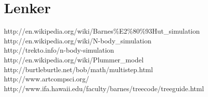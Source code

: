 \documentclass[11pt, oneside]{article}   	%
\begin{document}
\newpage
\section{Lenker}
http://en.wikipedia.org/wiki/Barnes\%E2\%80\%93Hut\_simulation\\
http://en.wikipedia.org/wiki/N-body\_simulation\\
http://trekto.info/n-body-simulation\\
http://en.wikipedia.org/wiki/Plummer\_model\\
http://burtleburtle.net/bob/math/multistep.html\\
http://www.artcompsci.org/
http://www.ifa.hawaii.edu/faculty/barnes/treecode/treeguide.html
\end{document}
